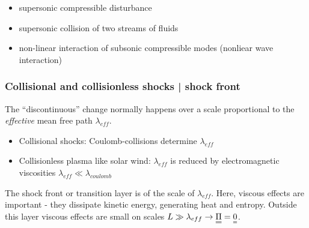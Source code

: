 
\begin{itemize}
    \item supersonic compressible disturbance
    \item supersonic collision of two streams of fluids
    \item non-linear interaction of subsonic compressible modes (nonliear wave interaction)
\end{itemize}

\subsubsection{Collisional and collisionless shocks | shock front}
The \enquote{discontinuous} change normally happens over a scale proportional to the \textit{effective} mean free path $\lambda_{eff}$.
\begin{itemize}
    \item Collisional shocks: Coulomb-collisions determine $\lambda_{eff}$
    \item Collisionless plasma like solar wind: $\lambda_{eff}$ is reduced by electromagnetic viscosities $\lambda_{eff} \ll \lambda_{coulomb}$
\end{itemize}

The shock front or transition layer is of the scale of $\lambda_{eff}$. Here, viscous effects are important - they dissipate kinetic energy, generating heat and entropy. Outside this layer viscous effects are small on scales $L \gg \lambda_{eff} \rightarrow \mat{\Pi} = \mat{0}$.

